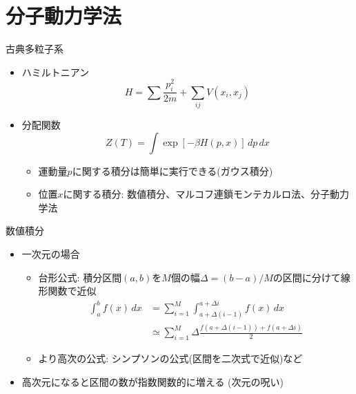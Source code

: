 \documentclass[dvipdfmx]{beamer}
\begin{document}


\section{分子動力学法}

\begin{frame}[t,fragile]{古典多粒子系}
  \begin{itemize}
    \setlength{\itemsep}{1em}
  \item ハミルトニアン
    \[
    H = \sum \frac{p_i^2}{2m} + \sum_{ij} V(x_i, x_j)
    \]
  \item 分配関数
    \[
    Z(T) = \int \exp [- \beta H(p,x) ] \, dp \, dx
    \]
    \begin{itemize}
    \item 運動量$p$に関する積分は簡単に実行できる(ガウス積分)
    \item 位置$x$に関する積分: 数値積分、マルコフ連鎖モンテカルロ法、分子動力学法
    \end{itemize}
  \end{itemize}
\end{frame}

\begin{frame}[t,fragile]{数値積分}
  \begin{itemize}
    \setlength{\itemsep}{1em}
  \item 一次元の場合
    \begin{itemize}
    \item 台形公式: 積分区間$(a,b)$を$M$個の幅$\Delta=(b-a)/M$の区間に分けて線形関数で近似
      \begin{align*}
        \int_a^b f(x) \, dx &= \sum_{i=1}^M \int_{a+\Delta (i-1)}^{a+\Delta i} f(x) \, dx \\
        &\simeq \sum_{i=1}^M \Delta \frac{f({a+\Delta (i-1)}) + f({a+\Delta i})}{2}
      \end{align*}
    \item より高次の公式: シンプソンの公式(区間を二次式で近似)など
    \end{itemize}
    \item 高次元になると区間の数が指数関数的に増える (次元の呪い)
  \end{itemize}
\end{frame}
\end{document}
